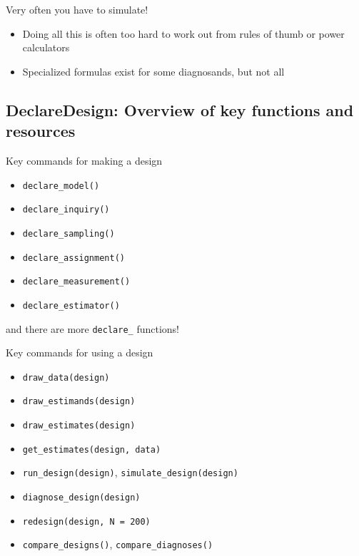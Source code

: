 \documentclass[
  11pt,
  ignorenonframetext,
]{beamer}
\providecommand{\tightlist}{%
  \setlength{\itemsep}{0pt}\setlength{\parskip}{0pt}}\usepackage{longtable,booktabs,array}
\begin{document}
\begin{frame}{Very often you have to simulate!}
\protect\hypertarget{very-often-you-have-to-simulate}{}
\begin{itemize}
\tightlist
\item
  Doing all this is often too hard to work out from rules of thumb or
  power calculators
\item
  Specialized formulas exist for some diagnosands, but not all
\end{itemize}
\end{frame}

\hypertarget{declaredesign-overview-of-key-functions-and-resources}{%
\subsection{DeclareDesign: Overview of key functions and
resources}\label{declaredesign-overview-of-key-functions-and-resources}}

\begin{frame}[fragile]{Key commands for making a design}
\protect\hypertarget{key-commands-for-making-a-design}{}
\begin{itemize}
\item
  \texttt{declare\_model()}
\item
  \texttt{declare\_inquiry()}
\item
  \texttt{declare\_sampling()}
\item
  \texttt{declare\_assignment()}
\item
  \texttt{declare\_measurement()}
\item
  \texttt{declare\_estimator()}
\end{itemize}

and there are more \texttt{declare\_} functions!
\end{frame}

\begin{frame}[fragile]{Key commands for using a design}
\protect\hypertarget{key-commands-for-using-a-design}{}
\begin{itemize}
\tightlist
\item
  \texttt{draw\_data(design)}
\item
  \texttt{draw\_estimands(design)}
\item
  \texttt{draw\_estimates(design)}
\item
  \texttt{get\_estimates(design,\ data)}
\item
  \texttt{run\_design(design)}, \texttt{simulate\_design(design)}
\item
  \texttt{diagnose\_design(design)}
\item
  \texttt{redesign(design,\ N\ =\ 200)}
\item
  \texttt{compare\_designs()}, \texttt{compare\_diagnoses()}
\end{itemize}
\end{frame}
\end{document}
